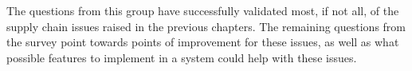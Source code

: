 The questions from this group have successfully validated most, if not all, of the supply chain issues raised in the previous chapters. The remaining questions from the survey point towards points of improvement for these issues, as well as what possible features to implement in a system could help with these issues.